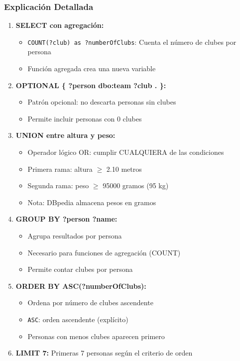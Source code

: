 \documentclass[12pt,a4paper]{article}
\begin{document}
\subsubsection{Explicación Detallada}

\begin{enumerate}
    \item \textbf{SELECT con agregación:}
    \begin{itemize}
        \item \texttt{COUNT(?club) as ?numberOfClubs}: Cuenta el número de clubes por persona
        \item Función agregada crea una nueva variable
    \end{itemize}
    
    \item \textbf{OPTIONAL \{ ?person dbo:team ?club . \}:}
    \begin{itemize}
        \item Patrón opcional: no descarta personas sin clubes
        \item Permite incluir personas con 0 clubes
    \end{itemize}
    
    \item \textbf{UNION entre altura y peso:}
    \begin{itemize}
        \item Operador lógico OR: cumplir CUALQUIERA de las condiciones
        \item Primera rama: altura $\geq$ 2.10 metros
        \item Segunda rama: peso $\geq$ 95000 gramos (95 kg)
        \item Nota: DBpedia almacena pesos en gramos
    \end{itemize}
    
    \item \textbf{GROUP BY ?person ?name:}
    \begin{itemize}
        \item Agrupa resultados por persona
        \item Necesario para funciones de agregación (COUNT)
        \item Permite contar clubes por persona
    \end{itemize}
    
    \item \textbf{ORDER BY ASC(?numberOfClubs):}
    \begin{itemize}
        \item Ordena por número de clubes ascendente
        \item \texttt{ASC}: orden ascendente (explícito)
        \item Personas con menos clubes aparecen primero
    \end{itemize}
    
    \item \textbf{LIMIT 7:} Primeras 7 personas según el criterio de orden
\end{enumerate}
\end{document}
